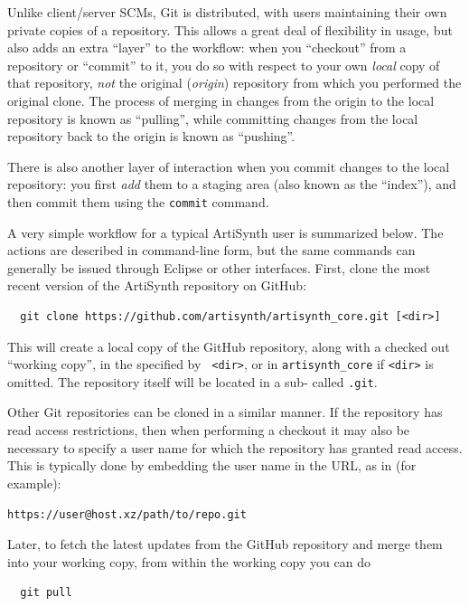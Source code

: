 Unlike client/server SCMs, Git is distributed, with users maintaining
their own private copies of a repository. This allows a great deal of
flexibility in usage, but also adds an extra ``layer'' to the
workflow: when you ``checkout'' from a repository or ``commit'' to it,
you do so with respect to your own {\it local} copy of that
repository, {\it not} the original ({\it origin}) repository from
which you performed the original clone. The process of merging in
changes from the origin to the local repository is known as
``pulling'', while committing changes from the local repository back
to the origin is known as ``pushing''.

There is also another layer of interaction when you commit changes to
the local repository: you first {\it add} them to a staging area
(also known as the ``index''), and then commit them using the {\tt commit}
command.

A very simple workflow for a typical ArtiSynth user is summarized
below. The actions are described in command-line form, but the same
commands can generally be issued through Eclipse or other
interfaces. First, clone the most recent version of the ArtiSynth
repository on GitHub:

\begin{verbatim}
  git clone https://github.com/artisynth/artisynth_core.git [<dir>]
\end{verbatim}

This will create a local copy of the GitHub repository, along with a
checked out ``working copy'', in the \directory{} specified by {\tt
<dir>}, or in {\tt artisynth\_core} if {\tt <dir>} is
omitted.  The repository itself will be located in a sub-\directory{}
called {\tt .git}.

Other Git repositories can be cloned in a similar manner.  If the
repository has read access restrictions, then when performing a checkout it
may also be necessary to specify a user name for which the repository
has granted read access. This is typically done by embedding the user
name in the URL, as in (for example):

{\tt https://user@host.xz/path/to/repo.git}

Later, to fetch the latest updates from the GitHub repository and
merge them into your working copy, from within the working copy
\directory{} you can do
\begin{verbatim}
  git pull
\end{verbatim}

